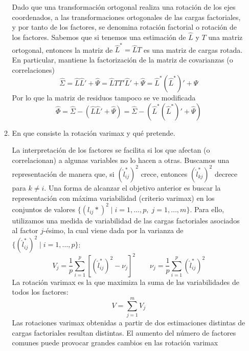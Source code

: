 \documentclass[twoside]{article}
\begin{document}
\begin{enumerate}
\begin{enumerate}
	Dado que una transformación ortogonal realiza una rotación de los ejes coordenados, a las transformaciones ortogonales de las cargas factoriales, y por tanto de los factores, se denomina rotación factorial o rotación de los factores. Sabemos que si tenemos una estimación de $\hat{L}$ y $T$ una matriz ortogonal, entonces la matriz de $\hat{L}^* = \hat{L}T$ es una matriz de cargas rotada. En particular, mantiene la factorización de la matriz de covarianzas (o correlaciones)
	$$
	\hat{\Sigma} = \hat{L}\hat{L}' + \hat{\Psi} = \hat{L}TT'\hat{L}' + \hat{\Psi} = \hat{L}^*(\hat{L}^*)'+\Psi
	$$ 
Por lo que la matriz de residuos tampoco se ve modificada
$$
\hat{\Phi} = \hat{\Sigma} -( \hat{L}\hat{L}' + \hat{\Psi}) =  \hat{\Sigma} -(\hat{L}^*(\hat{L}^*)' + \hat{\Psi})
$$
	\item En que consiste la rotación varimax y qué pretende.
	
	La interpretación de los factores se facilita si los que afectan (o correlacionan) a algunas variables no lo hacen a otras. Buscamos una representación de manera que, si $(\hat{l}_{ij}^*)^2$ crece, entonces $(\hat{l}_{kj}^*)^2$ decrece para $k\neq i$. Una forma de alcanzar el objetivo anterior es buscar la representación con máxima variabilidad (criterio varimax) en los conjuntos de valores $\{(l_{ij}*)^2 \mid i=1,\dotsc,p,\; j=1,\dotsc, m\}$. Para ello, utilizamos una medida de variabilidad de las cargas factoriales asociados al factor $j$-ésimo, la cual viene dada por la varianza de $\{(\hat{l}_{ij}^*)^2\mid i=1,\dotsc,p\}$:
	$$
	V_j =\frac{1}{p}\sum_{i=1}^p \left[(\hat{l}_{ij}^*)^2-\nu_j\right]^2 \qquad \nu_j = \frac{1}{p}\sum_{i=1}^p (\hat{l}_{ij}^*)^2
	$$
La rotación varimax es la que maximiza la suma de las variabilidades de todos los factores: 
$$
V = \sum_{j=1}^m V_j
$$
Las rotaciones varimax obtenidas a partir de dos estimaciones distintas de  cargas factoriales resultan distintas. El aumento del número de factores comunes puede provocar grandes cambios en las rotación varimax
\end{enumerate}
\end{enumerate}

\newpage
\end{document}
